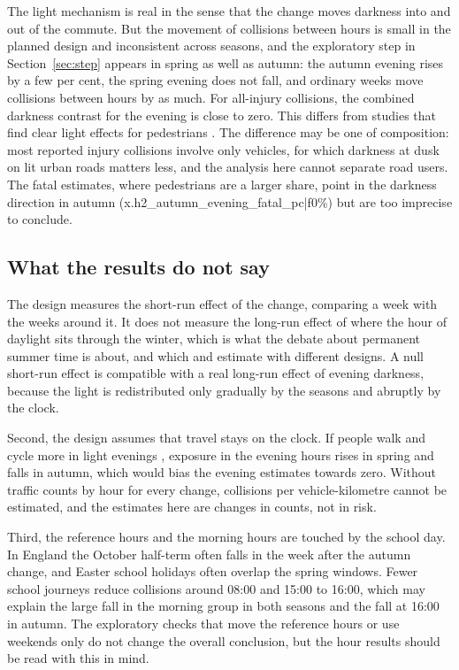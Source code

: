 \documentclass[11pt,a4paper]{article}
\begin{document}
The light mechanism is real in the sense that the change moves darkness into and out of the commute. But the movement of collisions between hours is small in the planned design and inconsistent across seasons, and the exploratory step in Section~\ref{sec:step} appears in spring as well as autumn: the autumn evening rises by a few per cent, the spring evening does not fall, and ordinary weeks move collisions between hours by as much. For all-injury collisions, the combined darkness contrast for the evening is close to zero. This differs from studies that find clear light effects for pedestrians \citep{sullivan2002,uttley2017aap,woods2025}. The difference may be one of composition: most reported injury collisions involve only vehicles, for which darkness at dusk on lit urban roads matters less, and the analysis here cannot separate road users. The fatal estimates, where pedestrians are a larger share, point in the darkness direction in autumn ({{x.h2_autumn_evening_fatal_pc|f0}}\%) but are too imprecise to conclude.

\subsection{What the results do not say}
The design measures the short-run effect of the change, comparing a week with the weeks around it. It does not measure the long-run effect of where the hour of daylight sits through the winter, which is what the debate about permanent summer time is about, and which \citet{broughton1999} and \citet{bunnings2021} estimate with different designs. A null short-run effect is compatible with a real long-run effect of evening darkness, because the light is redistributed only gradually by the seasons and abruptly by the clock.

Second, the design assumes that travel stays on the clock. If people walk and cycle more in light evenings \citep{uttley2017jep}, exposure in the evening hours rises in spring and falls in autumn, which would bias the evening estimates towards zero. Without traffic counts by hour for every change, collisions per vehicle-kilometre cannot be estimated, and the estimates here are changes in counts, not in risk.

Third, the reference hours and the morning hours are touched by the school day. In England the October half-term often falls in the week after the autumn change, and Easter school holidays often overlap the spring windows. Fewer school journeys reduce collisions around 08:00 and 15:00 to 16:00, which may explain the large fall in the morning group in both seasons and the fall at 16:00 in autumn. The exploratory checks that move the reference hours or use weekends only do not change the overall conclusion, but the hour results should be read with this in mind.
\end{document}
